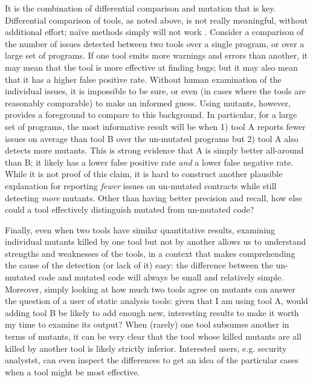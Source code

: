 It is the combination of differential comparison and mutation that is key.  Differential comparison of tools, as noted above, is not really meaningful, without additional effort; na\"ive methods simply will not work \cite{regehrRandom}.  Consider a comparison of the number of issues detected between two tools over a single program, or over a large set of programs.  If one tool emits more warnings and errors than another, it may mean that the tool is more effective at finding bugs; but it may also mean that it has a higher false positive rate.  Without human examination of the individual issues, it is impossible to be sure, or even (in cases where the tools are reasonably comparable) to make an informed guess.  Using mutants, however, provides a foreground to compare to this background.  In particular, for a large set of programs, the most informative result will be when 1) tool A reports fewer issues on average than tool B over the un-mutated programs but 2) tool A also detects more mutants.  This is strong evidence that A is simply better all-around than B; it likely has a lower false positive rate \emph{and} a lower false negative rate.  While it is not proof of this claim, it is hard to construct another plausible explanation for reporting \emph{fewer} issues on un-mutated contracts while still detecting \emph{more} mutants.  Other than having better precision and recall, how else could a tool effectively distinguish mutated from un-mutated code?

Finally, even when two tools have similar quantitative results, examining individual mutants killed by one tool but not by another allows us to understand strengths and weaknesses of the tools, in a context that makes comprehending the cause of the detection (or lack of it) easy: the difference between the un-mutated code and mutated code will always be small and relatively simple.  Moreover, simply looking at how much two tools agree on mutants can answer the question of a user of static analysis tools: given that I am using tool A, would adding tool B be likely to add enough new, interesting results to make it worth my time to examine its output?  When (rarely) one tool subsumes another in terms of mutants, it can be very clear that the tool whose killed mutants are all killed by another tool is likely strictly inferior.  Interested users, e.g. security analystst, can even inspect the differences to get an idea of the particular cases when a tool might be most effective.

